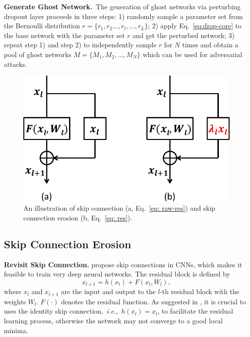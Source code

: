 \documentclass[letterpaper]{article} %
\newcommand{\citet}[1]{\citeauthor{#1} \shortcite{#1}}
\def\ie{\emph{i.e.}}
\begin{document}
\vspace{1ex}\noindent\textbf{Generate Ghost Network.}~The generation of ghost networks via perturbing dropout layer proceeds in three steps: 1) randomly sample a parameter set from the Bernoulli distribution $r=\{r_1,r_2...,r_l,...,r_L\}$; 2) apply Eq.~\eqref{eq:drop-core} to the base network with the parameter set $r$ and get the perturbed network; 3) repeat step 1) and step 2) to independently sample $r$ for $N$ times and obtain a pool of ghost networks $M=\{M_1,M_2,...,M_N\}$ which can be used for adversarial attacks.

\begin{figure}[tb]
\centering
\includegraphics[width=0.85\linewidth]{skip_connection_cropped.pdf}
\caption{An illustration of skip connection (a, Eq.~\eqref{eq: raw-res}) and skip connection erosion (b, Eq.~\eqref{eq: res}).}
\label{fig:residual}
\end{figure}

\subsection{Skip Connection Erosion} \label{sec:residual}
\vspace{1ex}\noindent\textbf{Revisit Skip Connection.} \citet{he2016deep} propose skip connections in CNNs, which makes it feasible to train very deep neural networks. 
The residual block is defined by
\begin{equation}\label{eq: raw-res}
x_{l+1}=h(x_l)+F(x_l,W_l),
\end{equation}
where $x_l$ and $x_{l+1}$ are the input and output to the $l$-th residual block with the weights $W_l$. $F(\cdot)$ denotes the residual function. As suggested in \citet{he2016identity}, it is crucial to uses the identity skip connection,~\ie,~$h(x_l) = x_l$, to facilitate the residual learning process, otherwise the network may not converge to a good local minima.
\end{document}
